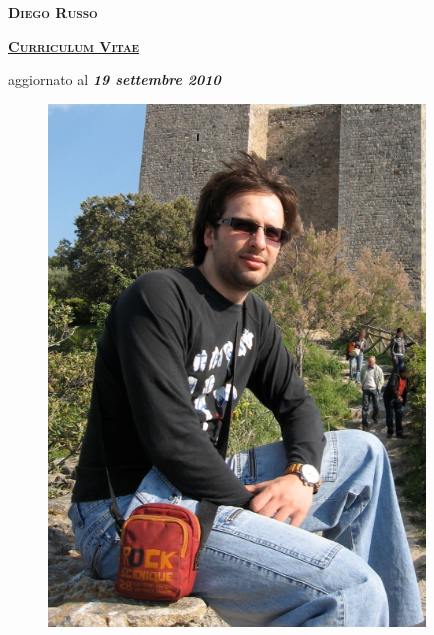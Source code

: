 \documentclass[totpages,helvetica,openbib,italian]{europecv}
\begin{document}
    \begin{center}
        \hspace{1pt}
        \vspace{2cm}
    
        {\scshape \textbf{\Huge Diego Russo}}
    
        \vspace{1cm}
    
        {\scshape \textbf{\large \underline{Curriculum Vitae}}}
    
        \vspace{0.25cm}
    
        aggiornato al \emph{\textbf{19 settembre 2010}}
        
        \vspace{2cm}
        
        \begin{figure}[htbp] 
            \begin{center} 
                \includegraphics[width=10cm]{io.jpg}
            \end{center} 
        \end{figure}
        
    \end{center}
\pagebreak
{}
\end{document}
